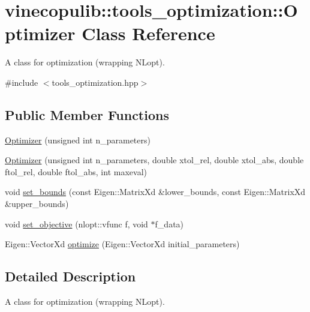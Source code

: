 \hypertarget{classvinecopulib_1_1tools__optimization_1_1_optimizer}{}\section{vinecopulib\+:\+:tools\+\_\+optimization\+:\+:Optimizer Class Reference}
\label{classvinecopulib_1_1tools__optimization_1_1_optimizer}


A class for optimization (wrapping N\+Lopt).  




{\ttfamily \#include $<$tools\+\_\+optimization.\+hpp$>$}

\subsection*{Public Member Functions}
\begin{DoxyCompactItemize}
\item 
\hyperlink{classvinecopulib_1_1tools__optimization_1_1_optimizer_a1514592e4adccdcc544bb32654e81da1}{Optimizer} (unsigned int n\+\_\+parameters)
\item 
\hyperlink{classvinecopulib_1_1tools__optimization_1_1_optimizer_a43190e80f015257e203c134826857c7c}{Optimizer} (unsigned int n\+\_\+parameters, double xtol\+\_\+rel, double xtol\+\_\+abs, double ftol\+\_\+rel, double ftol\+\_\+abs, int maxeval)
\item 
void \hyperlink{classvinecopulib_1_1tools__optimization_1_1_optimizer_a907419eedf3bb18766d2cb7340a06f7d}{set\+\_\+bounds} (const Eigen\+::\+Matrix\+Xd \&lower\+\_\+bounds, const Eigen\+::\+Matrix\+Xd \&upper\+\_\+bounds)
\item 
void \hyperlink{classvinecopulib_1_1tools__optimization_1_1_optimizer_a14495a0b3219e176fce553beb4a643b9}{set\+\_\+objective} (nlopt\+::vfunc f, void $\ast$f\+\_\+data)
\item 
Eigen\+::\+Vector\+Xd \hyperlink{classvinecopulib_1_1tools__optimization_1_1_optimizer_a3c4fcd7a4d3a792d2a9e57349f271764}{optimize} (Eigen\+::\+Vector\+Xd initial\+\_\+parameters)
\end{DoxyCompactItemize}


\subsection{Detailed Description}
A class for optimization (wrapping N\+Lopt). 

